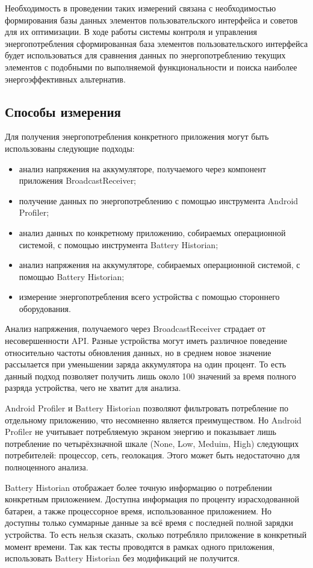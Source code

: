 \documentclass[a4paper,14pt]{extarticle} %
\begin{document}
	Необходимость в проведении таких измерений связана с необходимостью формирования базы данных элементов пользовательского интерфейса и советов для их оптимизации. В ходе работы системы контроля и управления энергопотребления сформированная база элементов пользовательского интерфейса будет использоваться для сравнения данных по энергопотреблению текущих элементов с подобными по выполняемой функциональности и поиска наиболее энергоэффективных альтернатив.
	
	\subsection{Способы измерения}
	
	Для получения энергопотребления конкретного приложения могут быть использованы следующие подходы:
	\begin{itemize}
		\item анализ напряжения на аккумуляторе, получаемого через компонент приложения BroadcastReceiver;
		\item получение данных по энергопотреблению с помощью инструмента Android Profiler;
		\item анализ данных по конкретному приложению, собираемых операционной системой, с помощью инструмента Battery Historian;
		\item анализ напряжения на аккумуляторе, собираемых операционной системой, с помощью Battery Historian;
		\item измерение энергопотребления всего устройства с помощью стороннего оборудования.
	\end{itemize}

	Анализ напряжения, получаемого через BroadcastReceiver страдает от несовершенности API. Разные устройства могут иметь различное поведение относительно частоты обновления данных, но в среднем новое значение рассылается при уменьшении заряда аккумулятора на один процент. То есть данный подход позволяет получить лишь около 100 значений за время полного разряда устройства, чего не хватит для анализа.
	
	Android Profiler и Battery Historian позволяют фильтровать потребление по отдельному приложению, что несомненно является преимуществом. Но Android Profiler не учитывает потребляемую экраном энергию и показывает лишь потребление по четырёхзначной шкале (None, Low, Meduim, High) следующих потребителей: процессор, сеть, геолокация. Этого может быть недостаточно для полноценного анализа.
	
	Battery Historian отображает более точную информацию о потреблении конкретным приложением. Доступна информация по проценту израсходованной батареи, а также процессорное время, использованное приложением. Но доступны только суммарные данные за всё время с последней полной зарядки устройства. То есть нельзя сказать, сколько потребляло приложение в конкретный момент времени. Так как тесты проводятся в рамках одного приложения, использовать Battery Historian без модификаций не получится. 
	
\end{document}
